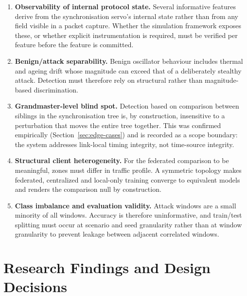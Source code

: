 \begin{enumerate}
  \item \textbf{Observability of internal protocol state.} Several informative
        features derive from the synchronisation servo's internal state rather than
        from any field visible in a packet capture. Whether the simulation framework
        exposes these, or whether explicit instrumentation is required, must be
        verified per feature before the feature is committed.
  \item \textbf{Benign/attack separability.} Benign oscillator behaviour includes
        thermal and ageing drift whose magnitude can exceed that of a deliberately
        stealthy attack. Detection must therefore rely on structural rather than
        magnitude-based discrimination.
  \item \textbf{Grandmaster-level blind spot.} Detection based on comparison between
        siblings in the synchronisation tree is, by construction, insensitive to a
        perturbation that moves the entire tree together. This was confirmed
        empirically (Section~\ref{sec:edge-cases}) and is recorded as a scope boundary: the system
        addresses link-local timing integrity, not time-source integrity.
  \item \textbf{Structural client heterogeneity.} For the federated comparison to be
        meaningful, zones must differ in traffic profile. A symmetric topology makes
        federated, centralized and local-only training converge to equivalent
        models and renders the comparison null by construction.
  \item \textbf{Class imbalance and evaluation validity.} Attack windows are a small
        minority of all windows. Accuracy is therefore uninformative, and train/test
        splitting must occur at scenario and seed granularity rather than at window
        granularity to prevent leakage between adjacent correlated windows.
\end{enumerate}

\section{Research Findings and Design Decisions}
\label{sec:research-findings}


